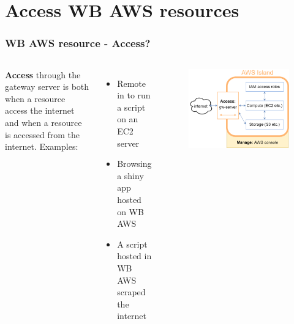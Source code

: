 \documentclass[aspectratio=169]{beamer} %
\begin{document}
\section{Access WB AWS resources}

\begin{frame}
	\frametitle{WB AWS resource - Access?}
	\begin{columns}[c]
		\textbf{Access} through the gateway server is both when a resource access the internet and when a resource is accessed from the internet. 
		\vspace{.5cm}\newline
		Examples:
		\begin{itemize}
			\item Remote in to run a script on an EC2 server
			\item Browsing a shiny app hosted on WB AWS
			\item A script hosted in WB AWS scraped the internet
		\end{itemize}
		
		\begin{figure}
			\centering
			\includegraphics[width=\textwidth]{./img/wb-aws.png}
		\end{figure}
		
	\end{columns}
\end{frame}
\end{document}
